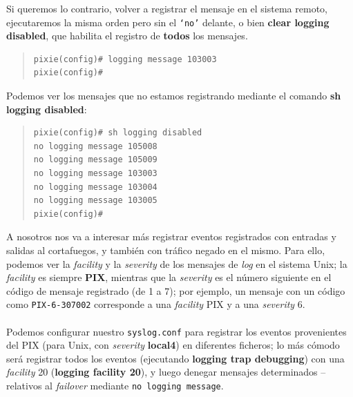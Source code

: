 Si queremos lo contrario, volver a registrar el mensaje en el sistema remoto, 
ejecutaremos la misma orden pero sin el {\tt `no'} delante, o bien {\bf clear
logging disabled}, que habilita el registro de {\bf todos} los mensajes.
\begin{quote}
\begin{verbatim}
pixie(config)# logging message 103003
pixie(config)# 
\end{verbatim}
\end{quote}
Podemos ver los mensajes que no estamos registrando mediante el comando {\bf sh 
logging disabled}:
\begin{quote}
\begin{verbatim}
pixie(config)# sh logging disabled
no logging message 105008
no logging message 105009
no logging message 103003
no logging message 103004
no logging message 103005
pixie(config)#
\end{verbatim}
\end{quote}
A nosotros nos va a interesar m\'as registrar eventos registrados con entradas
y salidas al cortafuegos, y tambi\'en con tr\'afico negado en el mismo. Para
ello, podemos ver la {\it facility} y la {\it severity} de los mensajes de {\it
log} en el sistema Unix; la {\it facility} es siempre {\bf PIX}, mientras que
la {\it severity} es el n\'umero siguiente en el c\'odigo de mensaje registrado
(de 1 a 7); por ejemplo, un mensaje con un c\'odigo como {\tt PIX-6-307002} 
corresponde a una {\it facility} PIX y a una {\it severity} 6.\\
\\Podemos configurar nuestro {\tt syslog.conf} para registrar los eventos 
provenientes del PIX (para Unix, con {\it severity} {\bf local4}) en diferentes
ficheros; lo m\'as c\'omodo ser\'a registrar todos los eventos (ejecutando {\bf
logging trap debugging}) con una {\it facility} 20 ({\bf logging facility 20}),
y luego denegar mensajes determinados -- relativos al {\it failover} mediante
{\tt no logging message}.
